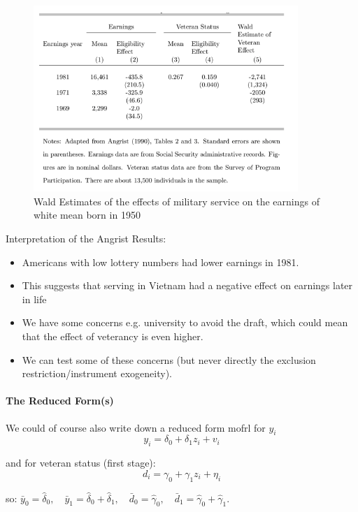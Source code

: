\documentclass[11pt]{article}
\begin{document}
\newpage
\begin{figure}[h]
    \centering
    \includegraphics[width=10cm]{photos/angrist results.png}
    \caption{Wald Estimates of the effects of military service on the earnings of white mean born in 1950}
    \label{fig:angrist results}
\end{figure}
\begin{example}
    Interpretation of the Angrist Results:

    \begin{itemize}
        \item Americans with low lottery numbers had lower earnings in 1981.
        \item This suggests that serving in Vietnam had a negative effect on earnings later in life
        \item We have some concerns e.g. university to avoid the draft, which could mean that the effect of veterancy is even higher.
        \item We can test some of these concerns (but never directly the exclusion restriction/instrument exogeneity).
    \end{itemize}
\end{example}

\paragraph{The Reduced Form(s)} \mbox{}

We could of course also write down a reduced form mofrl for $y_i$
\[y_i = \delta_0 + \delta_1 z_i + v_i\]

and for veteran status (first stage):
\[d_i = \gamma_0 + \gamma_1 z_i + \eta_i\]

so:
$\bar{y}_0=\hat{\delta}_0, \quad \bar{y}_1=\hat{\delta}_0+\hat{\delta}_1, \quad \bar{d}_0=\hat{\gamma}_0, \quad \bar{d}_1=\hat{\gamma}_0+\hat{\gamma}_1$.
\end{document}
